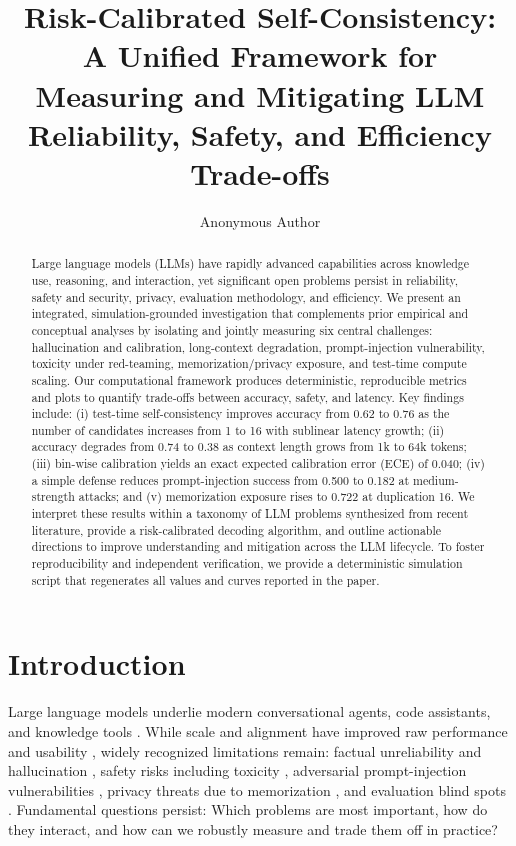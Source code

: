 \documentclass[10pt]{article}
\title{Risk-Calibrated Self-Consistency: A Unified Framework for\\
Measuring and Mitigating LLM Reliability, Safety, and Efficiency Trade-offs}
\author{Anonymous Author}
\date{}
\begin{document}
\maketitle

\begin{abstract}
Large language models (LLMs) have rapidly advanced capabilities across knowledge use, reasoning, and interaction, yet significant open problems persist in reliability, safety and security, privacy, evaluation methodology, and efficiency. We present an integrated, simulation-grounded investigation that complements prior empirical and conceptual analyses by isolating and jointly measuring six central challenges: hallucination and calibration, long-context degradation, prompt-injection vulnerability, toxicity under red-teaming, memorization/privacy exposure, and test-time compute scaling. Our computational framework produces deterministic, reproducible metrics and plots to quantify trade-offs between accuracy, safety, and latency. Key findings include: (i) test-time self-consistency improves accuracy from 0.62 to 0.76 as the number of candidates increases from 1 to 16 with sublinear latency growth; (ii) accuracy degrades from 0.74 to 0.38 as context length grows from 1k to 64k tokens; (iii) bin-wise calibration yields an exact expected calibration error (ECE) of 0.040; (iv) a simple defense reduces prompt-injection success from 0.500 to 0.182 at medium-strength attacks; and (v) memorization exposure rises to 0.722 at duplication 16. We interpret these results within a taxonomy of LLM problems synthesized from recent literature, provide a risk-calibrated decoding algorithm, and outline actionable directions to improve understanding and mitigation across the LLM lifecycle. To foster reproducibility and independent verification, we provide a deterministic simulation script that regenerates all values and curves reported in the paper.
\end{abstract}

\section{Introduction}
Large language models underlie modern conversational agents, code assistants, and knowledge tools \citep{Brown2020GPT3, OpenAI2023GPT4, Touvron2023LLaMA}. While scale and alignment have improved raw performance and usability \citep{Hoffmann2022Chinchilla, Ouyang2022RLHF, Bai2022ConstitutionalAI}, widely recognized limitations remain: factual unreliability and hallucination \citep{Ji2023HallucinationSurvey, Lin2022TruthfulQA}, safety risks including toxicity \citep{Weidinger2021EthicalRisks, Gehman2020RealToxicity}, adversarial prompt-injection vulnerabilities \citep{Perez2022RedTeam, Greshake2023IndirectPromptInjection, Zou2023UniversalJailbreaks}, privacy threats due to memorization \citep{Carlini2021ExtractingTrainingData, Carlini2023PoisoningWebScale}, and evaluation blind spots \citep{Liang2022HELM, Kiela2021Dynabench}. Fundamental questions persist: Which problems are most important, how do they interact, and how can we robustly measure and trade them off in practice?
\end{document}
